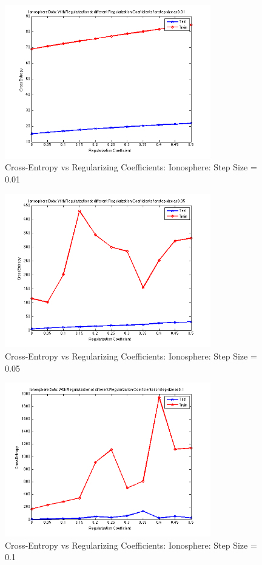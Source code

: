 \documentclass[paper=a4, fontsize=11pt]{scrartcl} %
\numberwithin{equation}{section} %
\numberwithin{figure}{section} %
\numberwithin{table}{section} %
\begin{document}
\begin{figure}[h!]
  \caption{Cross-Entropy vs Regularizing Coefficients: Ionosphere: Step Size = 0.01}
  \centering
    \includegraphics[width=0.8\textwidth]{../Pics/subGraphIono/Fig2.png}
\end{figure}

\begin{figure}[h!]
  \caption{Cross-Entropy vs Regularizing Coefficients: Ionosphere: Step Size = 0.05}
  \centering
    \includegraphics[width=0.8\textwidth]{../Pics/subGraphIono/Fig3.png}
\end{figure}

\begin{figure}[h!]
  \caption{Cross-Entropy vs Regularizing Coefficients: Ionosphere: Step Size = 0.1}
  \centering
    \includegraphics[width=0.8\textwidth]{../Pics/subGraphIono/Fig4.png}
\end{figure}
\end{document}

